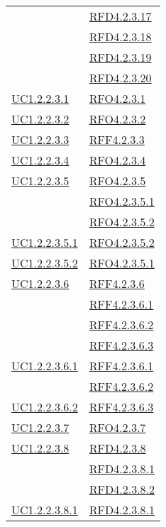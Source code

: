 \begin{longtable}{|>{\centering}m{5cm}|m{5cm}<{\centering}|}
& \hyperlink{RFD4.2.3.17}{RFD4.2.3.17}\\
& \hyperlink{RFD4.2.3.18}{RFD4.2.3.18}\\
& \hyperlink{RFD4.2.3.19}{RFD4.2.3.19}\\
& \hyperlink{RFD4.2.3.20}{RFD4.2.3.20}\\ \hline
\hyperref[UC1.2.2.3.1]{UC1.2.2.3.1} & \hyperlink{RFO4.2.3.1}{RFO4.2.3.1}\\ \hline
\hyperref[UC1.2.2.3.2]{UC1.2.2.3.2} & \hyperlink{RFO4.2.3.2}{RFO4.2.3.2}\\ \hline
\hyperref[UC1.2.2.3.3]{UC1.2.2.3.3} & \hyperlink{RFF4.2.3.3}{RFF4.2.3.3}\\ \hline
\hyperref[UC1.2.2.3.4]{UC1.2.2.3.4} & \hyperlink{RFO4.2.3.4}{RFO4.2.3.4}\\ \hline
\hyperref[UC1.2.2.3.5]{UC1.2.2.3.5} & \hyperlink{RFO4.2.3.5}{RFO4.2.3.5}\\
& \hyperlink{RFO4.2.3.5.1}{RFO4.2.3.5.1}\\
& \hyperlink{RFO4.2.3.5.2}{RFO4.2.3.5.2}\\ \hline
\hyperref[UC1.2.2.3.5.1]{UC1.2.2.3.5.1} & \hyperlink{RFO4.2.3.5.2}{RFO4.2.3.5.2}\\ \hline
\hyperref[UC1.2.2.3.5.2]{UC1.2.2.3.5.2} & \hyperlink{RFO4.2.3.5.1}{RFO4.2.3.5.1}\\ \hline
\hyperref[UC1.2.2.3.6]{UC1.2.2.3.6} & \hyperlink{RFF4.2.3.6}{RFF4.2.3.6}\\
& \hyperlink{RFF4.2.3.6.1}{RFF4.2.3.6.1}\\
& \hyperlink{RFF4.2.3.6.2}{RFF4.2.3.6.2}\\
& \hyperlink{RFF4.2.3.6.3}{RFF4.2.3.6.3}\\ \hline
\hyperref[UC1.2.2.3.6.1]{UC1.2.2.3.6.1} & \hyperlink{RFF4.2.3.6.1}{RFF4.2.3.6.1}\\
& \hyperlink{RFF4.2.3.6.2}{RFF4.2.3.6.2}\\ \hline
\hyperref[UC1.2.2.3.6.2]{UC1.2.2.3.6.2} & \hyperlink{RFF4.2.3.6.3}{RFF4.2.3.6.3}\\ \hline
\hyperref[UC1.2.2.3.7]{UC1.2.2.3.7} & \hyperlink{RFO4.2.3.7}{RFO4.2.3.7}\\ \hline
\hyperref[UC1.2.2.3.8]{UC1.2.2.3.8} & \hyperlink{RFD4.2.3.8}{RFD4.2.3.8}\\
& \hyperlink{RFD4.2.3.8.1}{RFD4.2.3.8.1}\\
& \hyperlink{RFD4.2.3.8.2}{RFD4.2.3.8.2}\\ \hline
\hyperref[UC1.2.2.3.8.1]{UC1.2.2.3.8.1} & \hyperlink{RFD4.2.3.8.1}{RFD4.2.3.8.1}\\ \hline

\end{longtable}
